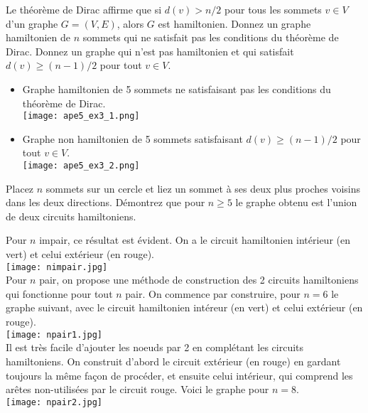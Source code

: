 Le théorème de Dirac affirme que si $d(v) > n/2$ pour tous les sommets $v \in V$ d'un graphe $G=(V,E)$, alors $G$ est hamiltonien. Donnez un graphe hamiltonien de $n$ sommets qui ne satisfait pas les conditions du théorème de Dirac. Donnez un graphe qui n'est pas hamiltonien et qui satisfait $d(v) \geq (n-1)/2$ pour tout $v \in V$.

\begin{solution}
\begin{itemize}
\item Graphe hamiltonien de 5 sommets ne satisfaisant pas les conditions du théorème de Dirac.\\
\texttt{[image: ape5\_ex3\_1.png]}
\item Graphe non hamiltonien de 5 sommets satisfaisant $d(v) \geq (n-1)/2$ pour tout $v \in V$.\\
\texttt{[image: ape5\_ex3\_2.png]}
\end{itemize}
\end{solution}

Placez $n$ sommets sur un cercle et liez un sommet à ses deux plus proches voisins dans les deux directions. Démontrez que pour $n \geq 5$ le graphe obtenu est l'union de deux circuits hamiltoniens.

\begin{solution}
Pour $n$ impair, ce résultat est évident. On a le circuit hamiltonien intérieur (en vert) et celui extérieur (en rouge).\\
\texttt{[image: nimpair.jpg]}
\\
Pour $n$ pair, on propose une méthode de construction des 2 circuits hamiltoniens qui fonctionne pour tout $n$ pair. On commence par construire, pour $n=6$ le graphe suivant, avec le circuit hamiltonien intéreur (en vert) et celui extérieur (en rouge).
\\
\texttt{[image: npair1.jpg]}
\\
Il est très facile d'ajouter les noeuds par 2 en complétant les circuits hamiltoniens. On construit d'abord le circuit extérieur (en rouge) en gardant toujours la même façon de procéder, et ensuite celui intérieur, qui comprend les arêtes non-utilisées par le circuit rouge. Voici le graphe pour $n=8$.
\\
\texttt{[image: npair2.jpg]}
\\
\end{solution}

